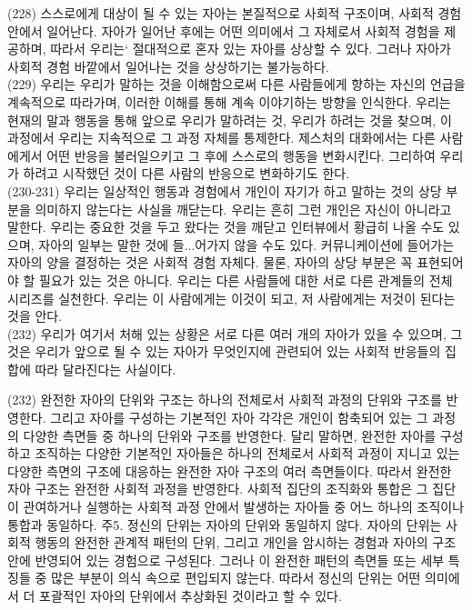 \documentclass[11pt, a4paper]{article}
\begin{document}
(228) 스스로에게 대상이 될 수 있는 자아는 본질적으로 사회적 구조이며, 사회적 경험 안에서 일어난다. 자아가 일어난 후에는 어떤 의미에서 그 자체로서 사회적 경험을 제공하며, 따라서 우리는` 절대적으로 혼자 있는 자아를 상상할 수 있다. 그러나 자아가 사회적 경험 바깥에서 일어나는 것을 상상하기는 불가능하다. \\

(229) 우리는 우리가 말하는 것을 이해함으로써 다른 사람들에게 향하는 자신의 언급을 계속적으로 따라가며, 이러한 이해를 통해 계속 이야기하는 방향을 인식한다. 우리는 현재의 말과 행동을 통해 앞으로 우리가 말하려는 것, 우리가 하려는 것을 찾으며, 이 과정에서 우리는 지속적으로 그 과정 자체를 통제한다. 제스처의 대화에서는 다른 사람에게서 어떤 반응을 불러일으키고 그 후에 스스로의 행동을 변화시킨다. 그리하여 우리가 하려고 시작했던 것이 다른 사람의 반응으로 변화하기도 한다.  \\

(230-231) 우리는 일상적인 행동과 경험에서 개인이 자기가 하고 말하는 것의 상당 부분을 의미하지 않는다는 사실을 깨닫는다. 우리는 흔히 그런 개인은 자신이 아니라고 말한다. 우리는 중요한 것을 두고 왔다는 것을 깨닫고 인터뷰에서 황급히 나올 수도 있으며, 자아의 일부는 말한 것에 들...어가지 않을 수도 있다. 커뮤니케이션에 들어가는 자아의 양을 결정하는 것은 사회적 경험 자체다. 물론, 자아의 상당 부분은 꼭 표현되어야 할 필요가 있는 것은 아니다. 우리는 다른 사람들에 대한 서로 다른 관계들의 전체 시리즈를 실천한다. 우리는 이 사람에게는 이것이 되고, 저 사람에게는 저것이 된다는 것을 안다. \\

(232) 우리가 여기서 처해 있는 상황은 서로 다른 여러 개의 자아가 있을 수 있으며, 그것은 우리가 앞으로 될 수 있는 자아가 무엇인지에 관련되어 있는 사회적 반응들의 집합에 따라 달라진다는 사실이다. 

(232) 완전한 자아의 단위와 구조는 하나의 전체로서 사회적 과정의 단위와 구조를 반영한다. 그리고 자아를 구성하는 기본적인 자아 각각은 개인이 함축되어 있는 그 과정의 다양한 측면들 중 하나의 단위와 구조를 반영한다. 달리 말하면, 완전한 자아를 구성하고 조직하는 다양한 기본적인 자아들은 하나의 전체로서 사회적 과정이 지니고 있는 다양한 측면의 구조에 대응하는 완전한 자아 구조의 여러 측면들이다. 따라서 완전한 자아 구조는 완전한 사회적 과정을 반영한다. 사회적 집단의 조직화와 통합은 그 집단이 관여하거나 실행하는 사회적 과정 안에서 발생하는 자아들 중 어느 하나의 조직이나 통합과 동일하다. 
주5. 정신의 단위는 자아의 단위와 동일하지 않다. 자아의 단위는 사회적 행동의 완전한 관계적 패턴의 단위, 그리고 개인을 암시하는 경험과 자아의 구조 안에 반영되어 있는 경험으로 구성된다. 그러나 이 완전한 패턴의 측면들 또는 세부 특징들 중 많은 부분이 의식 속으로 편입되지 않는다. 따라서 정신의 단위는 어떤 의미에서 더 포괄적인 자아의 단위에서 추상화된 것이라고 할 수 있다. 
\end{document}
